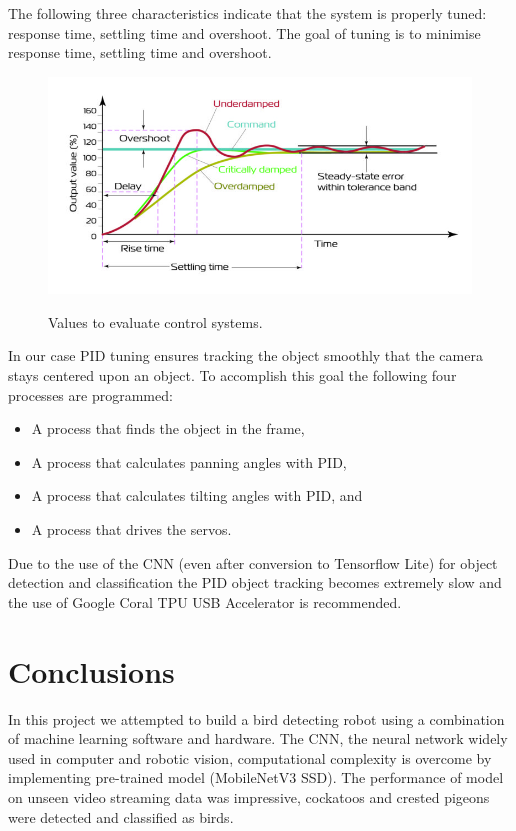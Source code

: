 \documentclass[runningheads]{llncs}
\begin{document}
\item\noindent The following three characteristics indicate that the system is properly tuned: response time, settling time and overshoot. The goal of tuning is to minimise response time, settling time and overshoot.

\begin{figure}[hbt!]
\includegraphics[width=\textwidth]{Motion_Controller.jpg}
\caption{Values to evaluate control systems.} \label{fig1}\cite{ref_url4}
\end{figure}

\item\noindent In our case PID tuning ensures tracking the object smoothly that the camera stays centered upon an object. 
To accomplish this goal the following four processes are programmed\cite{ref_url5}:
\begin{itemize}
 \item A process that finds the object in the frame,
 \item A process that calculates panning angles with PID,  
 \item A process that calculates tilting angles with PID, and
 \item A process that drives the servos.
\end{itemize}

Due to the use of the CNN (even after conversion to  Tensorflow Lite) for object detection and classification the PID object tracking becomes extremely slow and the use of Google Coral TPU USB Accelerator is recommended. 


\section{Conclusions} 
In this project we attempted to build a bird detecting robot using a combination of machine learning software and hardware. The CNN, the neural network widely used in computer and robotic vision, computational complexity is overcome by implementing pre-trained model (MobileNetV3 SSD). The performance of model on unseen video streaming data was impressive, cockatoos and crested pigeons were detected and classified as birds. 
\end{document}

